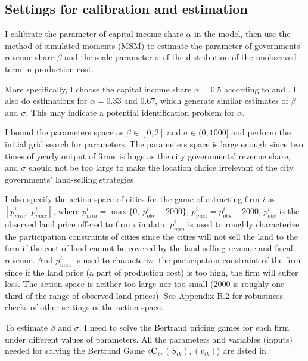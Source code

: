 \subsection{Settings for calibration and estimation}
\label{settings for estimation}
I calibrate the parameter of capital income share $\alpha$ in the model,
then use the method of simulated moments (MSM)
\citep{pakes1989simulation, mcfadden1989method,
    gourieroux1996simulation}
to estimate the parameter of governments' revenue share $\beta$
and the scale parameter $\sigma$ of the distribution of the unobserved term in production cost.


More specifically, I choose the capital income share
$\alpha = 0.5$ according to \cite{zhu2012understanding}
and \cite{brandt2008growth}. I also do estimations
for $\alpha = 0.33$ and $0.67$, which generate similar estimates
of $\beta$ and $\sigma$. This may indicate a potential identification
problem for $\alpha$.

I bound the parameters space as $\beta \in [0, 2]$ and $\sigma \in (0, 1000]$ and perform
the initial grid search for parameters. The parameters space is large
enough since two times of yearly output of firms is huge
as the city governments' revenue share,
and $\sigma$ should not be too large to make the location choice irrelevant
of the city governments' land-selling strategies.

I also specify the action space of cities for the game of attracting firm $i$ as
$[p^{i}_{min}, ~p^{i}_{max}]$, where $p^{i}_{min} = \max\{0, ~p^{i}_{obs} - 2000\}$,
$p^{i}_{max} = p^{i}_{obs} + 2000$, $p^{i}_{obs}$ is the observed
land price offered to firm $i$ in data. $p^{i}_{min}$ is used to roughly characterize
the participation constraints of cities since the cities will not sell the land to the firm
if the cost of land cannot be covered by the land-selling revenue and fiscal revenue.
And $p^{i}_{max}$ is used to characterize the participation constraint of the firm since
if the land price (a part of production cost) is too high, the firm will suffer loss.
The action space is neither too large nor too small
(2000 is roughly one-third of the range of observed land prices).
See \hyperref[sec:robustness checks 2]{Appendix B.2} for robustness checks of other settings
of the action space.

To estimate $\beta$ and $\sigma$, I need to
solve the Bertrand pricing games for each firm under different values of parameters.
All the parameters and variables (inputs) needed for solving the
Bertrand Game $\langle \mathbf{C}_{i}, (S_{ik}), (v_{ik}) \rangle$ are listed
in :


